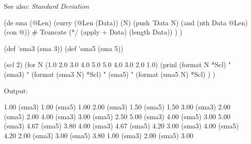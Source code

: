  See also: \emph{Standard Deviation}


\begin{wideverbatim}

(de sma (@Len)
   (curry (@Len (Data)) (N)
      (push 'Data N)
      (and (nth Data @Len) (con @))  # Truncate
      (*/ (apply + Data) (length Data)) ) )


(def 'sma3 (sma 3))
(def 'sma5 (sma 5))

(scl 2)
(for N (1.0 2.0 3.0 4.0 5.0 5.0 4.0 3.0 2.0 1.0)
   (prinl
      (format N *Scl)
      "   (sma3) "
      (format (sma3 N) *Scl)
      "   (sma5) "
      (format (sma5 N) *Scl) ) )

Output:

1.00   (sma3) 1.00   (sma5) 1.00
2.00   (sma3) 1.50   (sma5) 1.50
3.00   (sma3) 2.00   (sma5) 2.00
4.00   (sma3) 3.00   (sma5) 2.50
5.00   (sma3) 4.00   (sma5) 3.00
5.00   (sma3) 4.67   (sma5) 3.80
4.00   (sma3) 4.67   (sma5) 4.20
3.00   (sma3) 4.00   (sma5) 4.20
2.00   (sma3) 3.00   (sma5) 3.80
1.00   (sma3) 2.00   (sma5) 3.00

\end{wideverbatim}


% 
